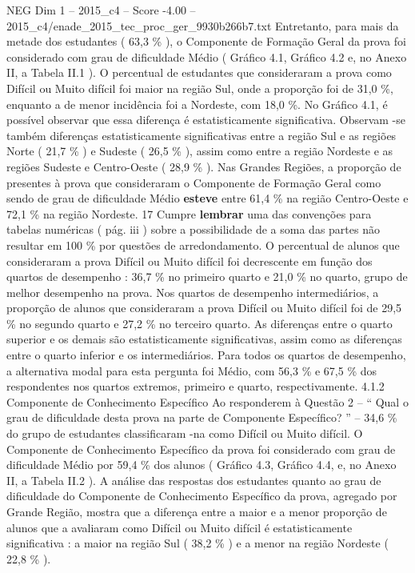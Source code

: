 \begin{textsample}{NEG Dim 1 – 2015\_c4 – Score -4.00 – 2015\_c4/enade\_2015\_tec\_proc\_ger\_9930b266b7.txt}
Entretanto, para mais da metade dos estudantes ( 63,3 \% ), o Componente de Formação Geral da prova foi considerado com grau de dificuldade Médio ( Gráfico 4.1, Gráfico 4.2 e, no Anexo II, a Tabela II.1 ).
O percentual de estudantes que consideraram a prova como Difícil ou Muito difícil foi maior na região Sul, onde a proporção foi de 31,0 \%, enquanto a de menor incidência foi a Nordeste, com 18,0 \%.
No Gráfico 4.1, é possível observar que essa diferença é estatisticamente significativa.
Observam -se também diferenças estatisticamente significativas entre a região Sul e as regiões Norte ( 21,7 \% ) e Sudeste ( 26,5 \% ), assim como entre a região Nordeste e as regiões Sudeste e Centro-Oeste ( 28,9 \% ).
Nas Grandes Regiões, a proporção de presentes à prova que consideraram o Componente de Formação Geral como sendo de grau de dificuldade Médio \textbf{esteve} entre 61,4 \% na região Centro-Oeste e 72,1 \% na região Nordeste. 17 Cumpre \textbf{lembrar} uma das convenções para tabelas numéricas ( pág. iii ) sobre a possibilidade de a soma das partes não resultar em 100 \% por questões de arredondamento.
O percentual de alunos que consideraram a prova Difícil ou Muito difícil foi decrescente em função dos quartos de desempenho : 36,7 \% no primeiro quarto e 21,0 \% no quarto, grupo de melhor desempenho na prova.
Nos quartos de desempenho intermediários, a proporção de alunos que consideraram a prova Difícil ou Muito difícil foi de 29,5 \% no segundo quarto e 27,2 \% no terceiro quarto.
As diferenças entre o quarto superior e os demais são estatisticamente significativas, assim como as diferenças entre o quarto inferior e os intermediários.
Para todos os quartos de desempenho, a alternativa modal para esta pergunta foi Médio, com 56,3 \% e 67,5 \% dos respondentes nos quartos extremos, primeiro e quarto, respectivamente. 4.1.2 Componente de Conhecimento Específico Ao responderem à Questão 2 – “ Qual o grau de dificuldade desta prova na parte de Componente Específico? ” – 34,6 \% do grupo de estudantes classificaram -na como Difícil ou Muito difícil.
O Componente de Conhecimento Específico da prova foi considerado com grau de dificuldade Médio por 59,4 \% dos alunos ( Gráfico 4.3, Gráfico 4.4, e, no Anexo II, a Tabela II.2 ).
A análise das respostas dos estudantes quanto ao grau de dificuldade do Componente de Conhecimento Específico da prova, agregado por Grande Região, mostra que a diferença entre a maior e a menor proporção de alunos que a avaliaram como Difícil ou Muito difícil é estatisticamente significativa : a maior na região Sul ( 38,2 \% ) e a menor na região Nordeste ( 22,8 \% ).

\end{textsample}
